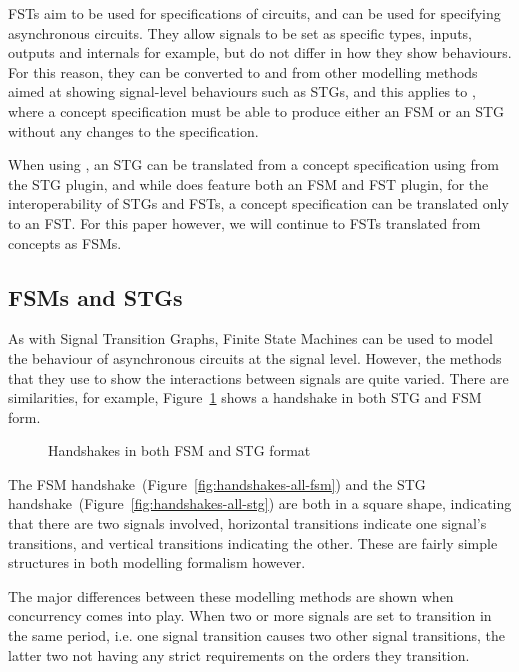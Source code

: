 FSTs aim to be used for specifications of circuits, and can be used for specifying asynchronous circuits. They allow signals
to be set as specific types, inputs, outputs and internals for example, but do not differ in how they show behaviours. For this reason, 
they can be converted to and from other modelling methods aimed at showing signal-level behaviours such as STGs, and this applies
to , where a concept specification must be able to produce either an FSM or an STG without any changes to the specification. 

When using , an STG can be translated from a concept specification using  from the STG plugin, and while  does
feature both an FSM and FST plugin, for the interoperability of STGs and FSTs, a concept specification can be translated only to an FST. For this paper however, 
we will continue to FSTs translated from concepts as FSMs. 

\subsection{FSMs and STGs \label{sub:FSMs-STGs}}

As with Signal Transition Graphs, Finite State Machines can be used to model the behaviour of asynchronous circuits at the signal level. However,
the methods that they use to show the interactions between signals are quite varied. There are similarities, for example, Figure~\ref{fig:handshakes-all}
shows a handshake in both STG and FSM form.

\begin{figure}[H]
\centering
{}
\hspace{20mm}
  \caption{\label{fig:handshakes-all} Handshakes in both FSM and STG format}
\end{figure}

The FSM handshake~(Figure~\ref{fig:handshakes-all-fsm}) and the STG handshake~(Figure~\ref{fig:handshakes-all-stg}) are both in a 
square shape, indicating that there are two signals involved, horizontal transitions indicate one signal's transitions, and vertical transitions 
indicating the other. These are fairly simple structures in both modelling formalism however. 

The major differences between these modelling methods are shown when concurrency comes into play. When two or more signals are
set to transition in the same period, i.e. one signal transition causes two other signal transitions, the latter two not having any
strict requirements on the orders they transition. 


